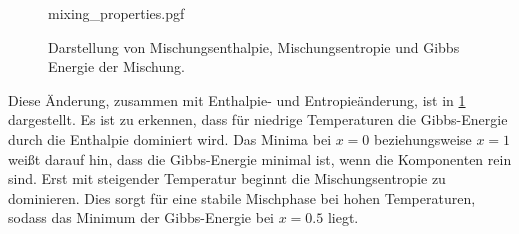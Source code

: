 \begin{figure}
    \centering
    {mixing_properties.pgf}
    \caption{Darstellung von Mischungsenthalpie, Mischungsentropie und Gibbs Energie der Mischung.
    }
    \label{fig:mixing_properties}
\end{figure}

Diese Änderung, zusammen mit Enthalpie- und Entropieänderung, ist in \cref{fig:mixing_properties} dargestellt.
Es ist zu erkennen, dass für niedrige Temperaturen die Gibbs-Energie durch die Enthalpie dominiert wird.
Das Minima bei $x=0$ beziehungsweise $x=1$ weißt darauf hin, dass die Gibbs-Energie minimal ist, wenn die
Komponenten rein sind.
Erst mit steigender Temperatur beginnt die Mischungsentropie zu dominieren.
Dies sorgt für eine stabile Mischphase bei hohen Temperaturen, sodass das Minimum der Gibbs-Energie bei $x=0.5$ liegt.
\autocite[7-9]{rost_phd}
